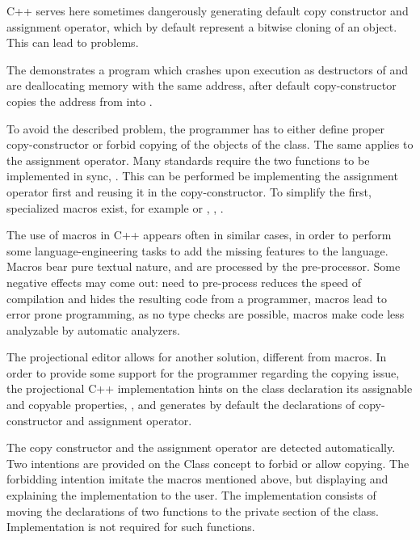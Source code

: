C++ serves here sometimes dangerously generating default copy constructor and assignment operator, which by default represent
a bitwise cloning of an object. This can lead to problems.


The  demonstrates a program which crashes upon execution as destructors of  and  are deallocating 
memory with the same address, after default copy-constructor copies the address from  into .

To avoid the described problem, the programmer has to either define proper copy-constructor or forbid copying of the objects of
the class. The same applies to the assignment operator. Many standards require the two functions to be implemented in sync, \cite{ooocpp}.
This can be performed be implementing the assignment operator first and reusing it in the copy-constructor. To simplify the first,
specialized macros exist, for example  or , \cite{googlecppstyle}, \cite{qobjref}.

The use of macros in C++ appears often in similar cases, in order to perform some language-engineering tasks to add the missing
features to the language. Macros bear pure textual nature, and are processed by the pre-processor. Some negative effects may 
come out: need to pre-process reduces the speed of compilation and hides the resulting code from a programmer, macros lead
to error prone programming, as no type checks are possible, macros make code less analyzable by automatic analyzers.



The projectional editor allows for another solution, different from macros.  In order to provide some support for the 
programmer regarding the copying issue, the projectional C++ implementation hints on the class declaration its 
assignable and copyable properties, , and generates by default the declarations of copy-constructor and assignment operator.

The copy constructor and the assignment operator are detected automatically. Two intentions are provided on the Class concept to
forbid or allow copying. The forbidding intention imitate the macros mentioned above, but displaying and explaining the 
implementation to the user. The implementation consists of moving the declarations of two functions to the private section of
the class. Implementation is not required for such functions.

